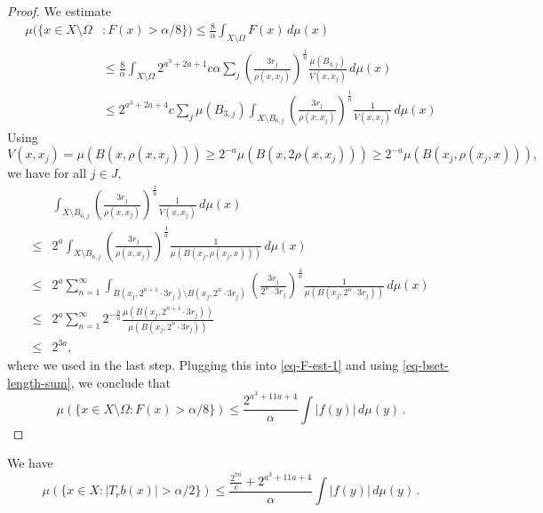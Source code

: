 \begin{proof}
    \leanok
    We estimate
    \begin{align}
        \mu(\{x\in X\setminus\Omega&: F(x)> \alpha/8\})
        \le \frac{8}{\alpha} \int_{X\setminus \Omega} F(x)\,d\mu(x) \\
        &\le \frac{8}{\alpha} \int_{X\setminus \Omega} 2^{a^3+2a+1} c\alpha \sum_{j} \left(\frac{3r_j}{\rho(x,x_j)}\right)^{\frac{1}{a}}\frac{\mu(B_{3,j})}{V(x,x_j)}\,d\mu(x) \\
        \label{eq-F-est-1}
        &\le 2^{a^3+2a+4} c \sum_{j} \mu(B_{3,j}) \int_{X\setminus B_{6,j}} \left(\frac{3r_j}{\rho(x,x_j)}\right)^{\frac{1}{a}}\frac{1}{V(x,x_j)}\,d\mu(x)
    \end{align}
    Using
    \begin{equation*}
        V(x,x_j) = \mu(B(x,\rho(x,x_j))) \ge 2^{-a}\mu(B(x,2\rho(x,x_j))) \ge 2^{-a} \mu(B(x_j,\rho(x_j,x))),
    \end{equation*}
    we have for all $j\in J$,
    \begin{align*}
        &\int_{X\setminus B_{6,j}} \left(\frac{3r_j}{\rho(x,x_j)}\right)^{\frac{1}{a}}\frac{1}{V(x,x_j)}\,d\mu(x) \\
        \le& 2^a \int_{X\setminus B_{6,j}} \left(\frac{3r_j}{\rho(x,x_j)}\right)^{\frac{1}{a}}\frac{1}{\mu(B(x_j,\rho(x_j,x)))}\,d\mu(x) \\
        \le&2^a \sum_{n=1}^\infty \int_{B(x_j,2^{n+1}\cdot3r_j)\setminus B(x_j,2^n\cdot3r_j)} \left(\frac{3r_j}{2^n \cdot3r_j}\right)^{\frac{1}{a}}\frac{1}{\mu(B(x_j,2^n \cdot3r_j))}\,d\mu(x) \\
        \le&2^a \sum_{n=1}^\infty 2^{-\frac{n}{a}} \frac{\mu(B(x_j,2^{n+1}\cdot3r_j))}{\mu(B(x_j,2^n \cdot3r_j))} \\
        \le&2^{3a},
    \end{align*}
    where we used  in the last step.
    Plugging this into \eqref{eq-F-est-1} and using \eqref{eq-bset-length-sum}, we conclude that
    \begin{equation*}
        \mu(\{x\in X\setminus\Omega: F(x)> \alpha/8\}) \le \frac{2^{a^3+11a+4}}{\alpha} \int |f(y)|\,d\mu(y)\,.
    \end{equation*}
\end{proof}


\begin{lemma}
    \label{estimate-bad}
    \leanok
    We have
    \begin{equation*}
        \mu\left({\{x\in X: |T_r b(x)|>\alpha/2\}}\right) \le  \frac{\frac{2^{7a}}{c} + 2^{a^3+11a+4}}{\alpha} \int |f(y)|\,d\mu(y) \,.
    \end{equation*}
\end{lemma}

